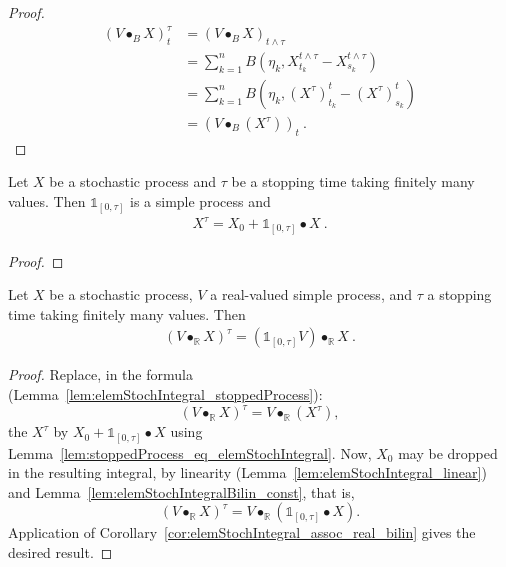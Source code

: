 \begin{proof}
  \leanok
\begin{align*}
  (V \bullet_B X)^\tau_t
  &= (V \bullet_B X)_{t \wedge \tau}
  \\
  &= \sum_{k=1}^{n} B (\eta_k, X^{t \wedge \tau}_{t_k} - X^{t \wedge \tau}_{s_k})
  \\
  &= \sum_{k=1}^{n} B (\eta_k, (X^{\tau})^t_{t_k} - (X^{\tau})^t_{s_k})
  \\
  &= (V \bullet_B (X^{\tau}))_t
  \: .
\end{align*}
\end{proof}

\begin{lemma}\label{lem:stoppedProcess_eq_elemStochIntegral}
  \notready
Let $X$ be a stochastic process and $τ$ be a stopping time taking finitely many values.
Then $\mathbb{1}_{[0, τ]}$ is a simple process and
\begin{align*}
  X^τ = X_0 + \mathbb{1}_{[0, τ]} \bullet X
  \: .
\end{align*}
\end{lemma}

\begin{proof}

\end{proof}


\begin{lemma}\label{lem:elemStochIntegral_stoppedIntegrator}
Let $X$ be a stochastic process,
$V$ a real-valued %
simple process,
and $τ$ a stopping time taking finitely many values.
Then
\begin{align*}
  (V \bullet_{\mathbb{R}} X)^τ = (\mathbb{1}_{[0,τ]}V) \bullet_{\mathbb{R}} X
  \: .
\end{align*}
\end{lemma}

\begin{proof}
Replace,
in the formula (Lemma~\ref{lem:elemStochIntegral_stoppedProcess}):
\[
  (V \bullet_{\mathbb{R}} X)^τ = V \bullet_{\mathbb{R}} (X^τ),
\]
  the $X^\tau$ by $X_0 + \mathbb{1}_{[0, τ]} \bullet X$
  using Lemma~\ref{lem:stoppedProcess_eq_elemStochIntegral}.
Now, $X_0$ may be dropped in the resulting integral,
by linearity (Lemma~\ref{lem:elemStochIntegral_linear})
and Lemma~\ref{lem:elemStochIntegralBilin_const},
that is,
\[
  (V \bullet_{\mathbb{R}} X)^τ = V \bullet_{\mathbb{R}} (\mathbb{1}_{[0, τ]} \bullet X).
\]
Application of Corollary~\ref{cor:elemStochIntegral_assoc_real_bilin}
gives the desired result.
\end{proof}



